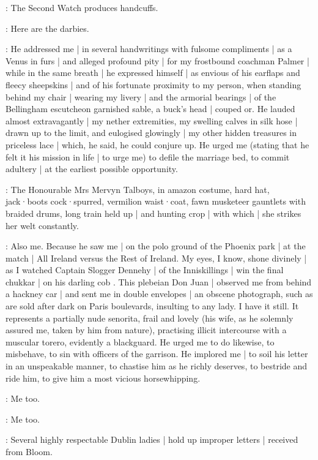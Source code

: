 :
The Second Watch produces handcuffs.

\SecondWatch:
Here are the darbies.

\Bellingham:
He addressed me |
in several handwritings with fulsome compliments |
as a Venus in furs |
and alleged profound pity |
for my frostbound coachman Palmer |
while in the same breath |
he expressed himself |
as envious of his earflaps and fleecy sheepskins |
and of his fortunate proximity to my person,
when standing behind my chair |
wearing my livery |
and the armorial bearings |
of the Bellingham escutcheon garnished sable,
a buck's head |
couped or.
He lauded almost extravagantly |
my nether extremities,
my swelling calves in silk hose |
drawn up to the limit,
and eulogised glowingly |
my other hidden treasures in priceless lace |
which,
he said,
he could conjure up.
He urged me
(stating that he felt it his mission in life |
to urge me)
to defile the marriage bed,
to commit adultery |
at the earliest possible opportunity.

:
The Honourable Mrs Mervyn Talboys,
in amazon costume,
hard hat,
jack·boots cock·spurred,
vermilion waist·coat,
fawn musketeer gauntlets with braided drums,
long train held up |
and hunting crop |
with which |
she strikes her welt constantly.

\Talboys:
Also me.
Because he saw me |
on the polo ground of the Phoenix park |
at the match |
All Ireland versus the Rest of Ireland.
My eyes,
I know,
shone divinely |
as I watched Captain Slogger Dennehy |
of the Inniskillings |
win the final chukkar |
on his darling cob .
This plebeian Don Juan |
observed me from behind a hackney car |
and sent me in double envelopes |
an obscene photograph,
such as are sold after dark on Paris boulevards,
insulting to any lady.
I have it still.
It represents a partially nude senorita,
frail and lovely
(his wife,
as he solemnly assured me,
taken by him from nature),
practising illicit intercourse with a muscular torero,
evidently a blackguard.
He urged me to do likewise,
to misbehave,
to sin with officers of the garrison.
He implored me |
to soil his letter in an unspeakable manner,
to chastise him as he richly deserves,
to bestride and ride him,
to give him a most vicious horsewhipping.

\Bellingham:
Me too.

\Yelverton:
Me too.

:
Several highly respectable Dublin ladies |
hold up improper letters |
received from Bloom.

